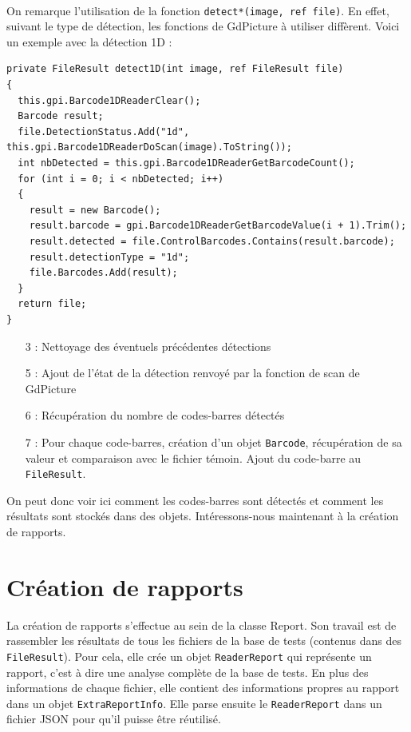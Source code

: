 \paragraph{}

On remarque l'utilisation de la fonction \verb|detect*(image, ref file)|. En effet, suivant le type de détection, les fonctions de GdPicture à utiliser diffèrent. Voici un exemple avec la détection 1D :

\begin{lstlisting}
private FileResult detect1D(int image, ref FileResult file)
{
  this.gpi.Barcode1DReaderClear();
  Barcode result;
  file.DetectionStatus.Add("1d", this.gpi.Barcode1DReaderDoScan(image).ToString());
  int nbDetected = this.gpi.Barcode1DReaderGetBarcodeCount();
  for (int i = 0; i < nbDetected; i++)
  {
    result = new Barcode();
    result.barcode = gpi.Barcode1DReaderGetBarcodeValue(i + 1).Trim();
    result.detected = file.ControlBarcodes.Contains(result.barcode);
    result.detectionType = "1d";
    file.Barcodes.Add(result);
  }
  return file;
}
\end{lstlisting}

\begin{itemize}
\item[3 :] Nettoyage des éventuels précédentes détections
\item[5 :] Ajout de l'état de la détection renvoyé par la fonction de scan de GdPicture
\item[6 :] Récupération du nombre de codes-barres détectés
\item[7 :] Pour chaque code-barres, création d'un objet \verb|Barcode|, récupération de sa valeur et comparaison avec le fichier témoin. Ajout du code-barre au \verb|FileResult|.
\end{itemize}

On peut donc voir ici comment les codes-barres sont détectés et comment les résultats sont stockés dans des objets. Intéressons-nous maintenant à la création de rapports.

\section{Création de rapports}

La création de rapports s'effectue au sein de la classe Report. Son travail est de rassembler les résultats de tous les fichiers de la base de tests (contenus dans des \verb|FileResult|). Pour cela, elle crée un objet \verb|ReaderReport| qui représente un rapport, c'est à dire une analyse complète de la base de tests. En plus des informations de chaque fichier, elle contient des informations propres au rapport dans un objet \verb|ExtraReportInfo|. Elle parse ensuite le \verb|ReaderReport| dans un fichier JSON pour qu'il puisse être réutilisé.

